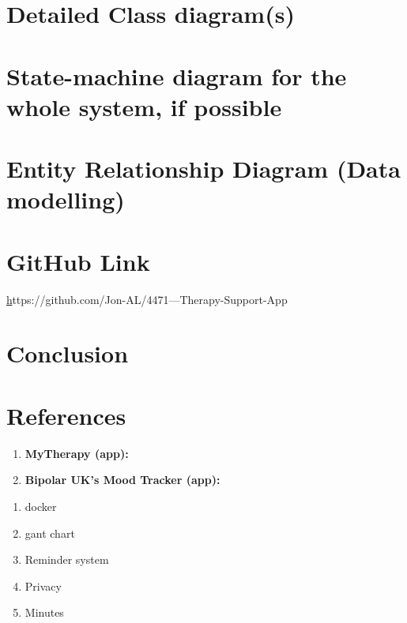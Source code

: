 \documentclass[11pt]{article}
\begin{document}
    \section{Detailed Class diagram(s)}\label{sec:detailed-class-diagram(s)}


    \section{State-machine diagram {for the whole system, if possible}}\label{sec:state-machine-diagram}


    \section{Entity Relationship Diagram (Data modelling)}\label{sec:er--diagram-(data-modelling)}


    \section{GitHub Link}\label{sec:github-link}
    \href{Group Therapy-Support-App}
    https://github.com/Jon-AL/4471---Therapy-Support-App


    \section{Conclusion}\label{sec:conclusion}


    \section{References}\label{sec:reference}

    \begin{enumerate}
        \item \textbf{MyTherapy (app):} \cite{MyTherapy}
        \item \textbf{Bipolar UK’s Mood Tracker (app):} \cite{BiPolUK}
    \end{enumerate}

    

    \printbibliography[heading=subbibintoc]



    \begin{figure}
        \label{fig:Gant Chart}
    \end{figure}

    \begin{enumerate}
        \item docker
        \item gant chart
        \item Reminder system
        \item Privacy
        \item Minutes
    \end{enumerate}
\end{document}

